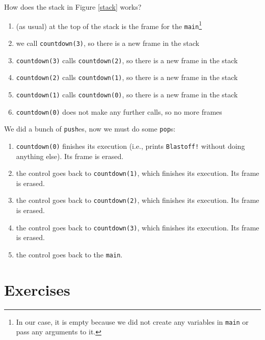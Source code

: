 \documentclass[t,handout,9pt]{beamer}
\begin{document}
\begin{frame}
\vfill
How does the stack in Figure \ref{stack} works?
\begin{enumerate}
	\item (as usual) at the top of the stack is the frame for the \texttt{main}\footnote{In our case, it is empty because we did not create any variables in \texttt{main} or pass any arguments to it.}
	\item we call \texttt{countdown(3)}, so there is a new frame in the stack
	\item \texttt{countdown(3)} calls \texttt{countdown(2)}, so there is a new frame in the stack
	\item \texttt{countdown(2)} calls \texttt{countdown(1)}, so there is a new frame in the stack
	\item \texttt{countdown(1)} calls \texttt{countdown(0)}, so there is a new frame in the stack
	\item \texttt{countdown(0)} does not make any further calls, so no more frames
\end{enumerate}
We did a bunch of \texttt{push}es, now we must do some \texttt{pop}s:
\begin{enumerate}
	\item \texttt{countdown(0)} finishes its execution (i.e., prints \texttt{Blastoff!} without doing anything else). Its frame is erased.
	\item the control goes back to \texttt{countdown(1)}, which finishes its execution. Its frame is erased.
	\item the control goes back to \texttt{countdown(2)}, which finishes its execution. Its frame is erased.
	\item the control goes back to \texttt{countdown(3)}, which finishes its execution. Its frame is erased.
	\item the control goes back to the \texttt{main}.
\end{enumerate}
\vfill
\end{frame}
\section{Exercises}
\end{document}
